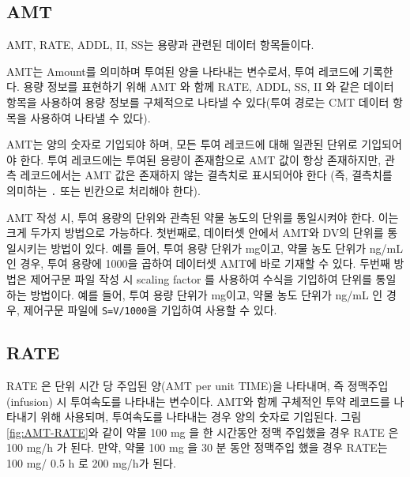 \documentclass[
  11pt,
  krantz2,
  a4paper]{krantz}
\theoremstyle{definition}
\theoremstyle{definition}
\theoremstyle{definition}
\theoremstyle{remark}
\begin{document}

\hypertarget{amt}{%
\subsection{AMT}\label{amt}}


AMT, RATE, ADDL, II, SS는 용량과 관련된 데이터 항목들이다.

AMT는 Amount를 의미하며 투여된 양을 나타내는 변수로서, 투여 레코드에 기록한다. 용량 정보를 표현하기 위해 AMT 와 함께 RATE, ADDL, SS, II 와 같은 데이터 항목을 사용하여 용량 정보를 구체적으로 나타낼 수 있다(투여 경로는 CMT 데이터 항목을 사용하여 나타낼 수 있다).

AMT는 양의 숫자로 기입되야 하며, 모든 투여 레코드에 대해 일관된 단위로 기입되어야 한다. 투여 레코드에는 투여된 용량이 존재함으로 AMT 값이 항상 존재하지만, 관측 레코드에서는 AMT 값은 존재하지 않는 결측치로 표시되어야 한다 (즉, 결측치를 의미하는 \texttt{.} 또는 빈칸으로 처리해야 한다).

AMT 작성 시, 투여 용량의 단위와 관측된 약물 농도의 단위를 통일시켜야 한다. 이는 크게 두가지 방법으로 가능하다. 첫번째로, 데이터셋 안에서 AMT와 DV의 단위를 통일시키는 방법이 있다. 예를 들어, 투여 용량 단위가 mg이고, 약물 농도 단위가 ng/mL 인 경우, 투여 용량에 1000을 곱하여 데이터셋 AMT에 바로 기재할 수 있다. 두번째 방법은 제어구문 파일 작성 시 scaling factor 를 사용하여 수식을 기입하여 단위를 통일하는 방법이다. 예를 들어, 투여 용량 단위가 mg이고, 약물 농도 단위가 ng/mL 인 경우, 제어구문 파일에 \texttt{S=V/1000}을 기입하여 사용할 수 있다.

\hypertarget{rate}{%
\subsection{RATE}\label{rate}}


RATE 은 단위 시간 당 주입된 양(AMT per unit TIME)을 나타내며, 즉 정맥주입(infusion) 시 투여속도를 나타내는 변수이다. AMT와 함께 구체적인 투약 레코드를 나타내기 위해 사용되며, 투여속도를 나타내는 경우 양의 숫자로 기입된다. 그림 \ref{fig:AMT-RATE}와 같이 약물 100 mg 을 한 시간동안 정맥 주입했을 경우 RATE 은 100 mg/h 가 된다. 만약, 약물 100 mg 을 30 분 동안 정맥주입 했을 경우 RATE는 100 mg/ 0.5 h 로 200 mg/h가 된다.
\end{document}
